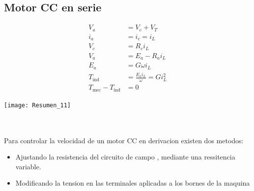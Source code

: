 \documentclass[
  11pt,
  letterpaper,
   addpoints,
   answers
  ]{exam}
\begin{document}
\subsection*{Motor CC en serie}
\begin{minipage}{0.6\textwidth} %
  \begin{align*}
      V_a &= V_c + V_T \\
      i_a &= i_c = i_L \\
      V_c &= R_c i_L \\
      V_a &= E_a - R_a i_L \\
      E_a &= G \omega i_L \\
      T_{\text{ind}} &= \frac{E_a i_L}{\omega} = G i_L^2 \\
      T_{\text{mec}} - T_{\text{ind}} &= 0
  \end{align*}
\end{minipage}%
\hfill
\begin{minipage}{0.35\textwidth}
  \centering
  \texttt{[image: Resumen\_11]} 
\end{minipage}\\\\
Para controlar la velocidad de un motor CC en derivacion existen dos metodos:
\begin{itemize}
  \item Ajustando la resistencia del circuito de campo , mediante una ressitencia variable.
  \item Modificando la tension en las terminales aplicadas a los bornes de la maquina
\end{itemize}
\end{document}
